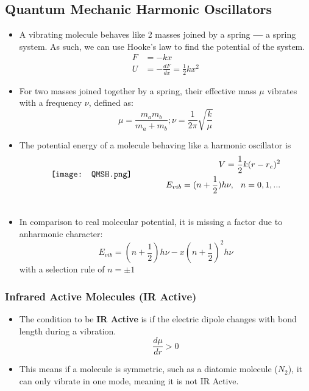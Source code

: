 \documentclass[12pt, letterpaper, twoside]{article}
\begin{document}
\subsection{Quantum Mechanic Harmonic Oscillators}
\begin{itemize}
    \item A vibrating molecule behaves like 2 masses joined by a spring \textbf{---} a spring system. As such, we can use Hooke's law to find the potential of the system.
    \begin{align*}
        F &= -kx \\
        U &= -\frac{dF}{dx} = \frac{1}{2}kx^2
    \end{align*}
    \item For two masses joined together by a spring, their effective mass $\mu$ vibrates with a frequency $\nu$, defined as:
    \begin{equation*}
        \mu = \frac{m_am_b}{m_a + m_b}; \nu = \frac{1}{2\pi}\sqrt{\frac{k}{\mu}}
    \end{equation*}
    \item The potential energy of a molecule behaving like a harmonic oscillator is
    \begin{align}
    \vcenter{\hbox{\texttt{[image: QMSH.png]}}}
        &\qquad\qquad
        \begin{aligned}
             V = \frac{1}{2}k(r-r_e)^2 \\
             E_{vib} = (n + \frac{1}{2})h\nu,\hspace{0.25cm} n = 0, 1, ...
        \end{aligned}\\
        \vcenter{\hbox{\begin{minipage}{7cm}
        \end{minipage}}}
        & \notag
    \end{align}
    \item In comparison to real molecular potential, it is missing a factor due to anharmonic character:
    \begin{equation}
        E_{vib} = (n +\frac{1}{2})h\nu - x(n +\frac{1}{2})^2h\nu
    \end{equation}
    with a selection rule of $n = \pm1$
\end{itemize}
\subsubsection{Infrared Active Molecules (IR Active)}
\begin{itemize}
    \item The condition to be \textbf{IR Active} is if the electric dipole changes with bond length during a vibration.
    \begin{equation*}
        \frac{d\mu}{dr} > 0
    \end{equation*}
    \item This means if a molecule is symmetric, such as a diatomic molecule ($N_2$), it can only vibrate in one mode, meaning it is not IR Active.
\end{itemize}
\end{document}

